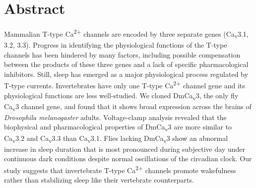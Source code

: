 \section*{Abstract}

Mammalian T-type Ca\textsuperscript{2+} channels are encoded by three separate genes (Ca\textsubscript{v}3.1, 3.2, 3.3).
Progress in identifying the physiological functions of the T-type channels has been hindered by many factors, including possible compensation between the products of these three genes and a lack of specific pharmacological inhibitors.
Still, sleep has emerged as a major physiological process regulated by T-type currents.
Invertebrates have only one T-type Ca\textsuperscript{2+} channel gene and its physiological functions are less well-studied.
We cloned DmCa\textsubscript{v}3, the only fly Ca\textsubscript{v}3 channel gene, and found that it shows broad expression across the brains of \emph{Drosophila melanogaster} adults.
Voltage-clamp analysis revealed that the biophysical and pharmacological properties of DmCa\textsubscript{v}3 are more similar to Ca\textsubscript{v}3.2 and Ca\textsubscript{v}3.3 than Ca\textsubscript{v}3.1.
Flies lacking DmCa\textsubscript{v}3 show an abnormal increase in sleep duration that is most pronounced during subjective day under continuous dark conditions despite normal oscillations of the circadian clock.
Our study suggests that invertebrate T-type Ca\textsuperscript{2+} channels promote wakefulness rather than stabilizing sleep like their vertebrate counterparts.
  
  
  